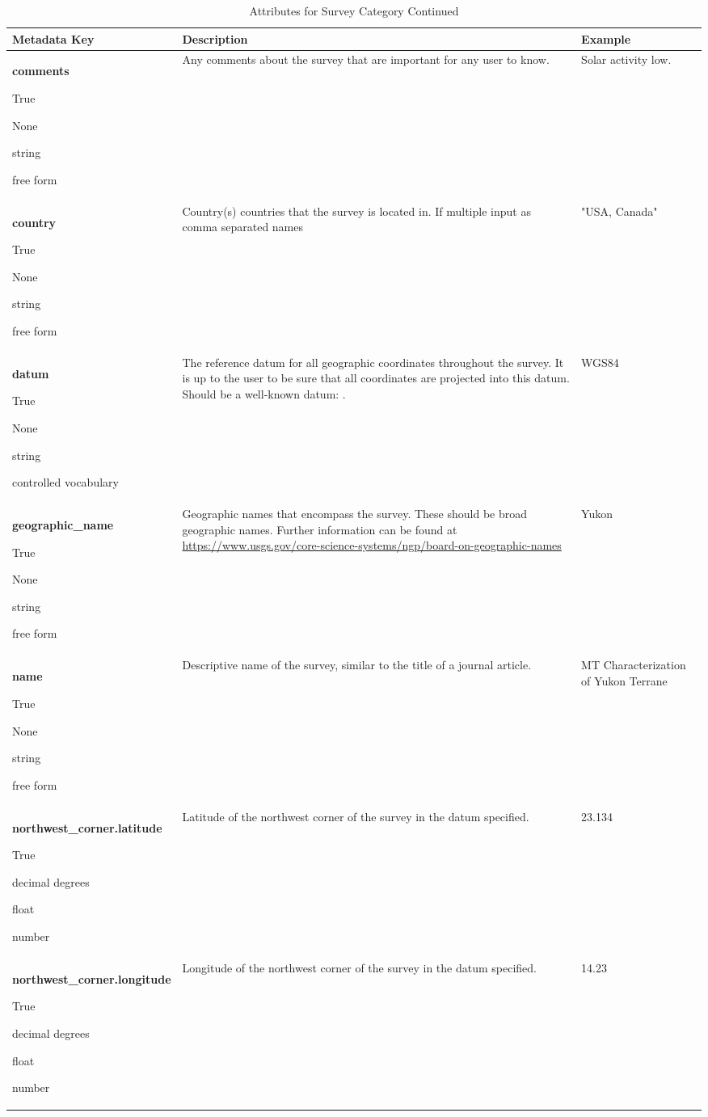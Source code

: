 \documentclass[12pt]{article}
\newcommand{\entry}[7]{
	\textbf{#1} 
	\begin{itemize}[topsep=5pt,itemsep=-.1pt,parsep=-2pt,partopsep=0pt,labelwidth=2em,align=left,itemindent=1em]
		\begin{small}
			\item[Required:] #2
			\item[Units:] #3
			\item[Type:] #4
			\item[Style:] #5
		\end{small}
	\end{itemize} & #6 & #7 \\ \midrule}
\begin{document}
\begin{table}[h!]
	\caption*{Attributes for Survey Category Continued}
	\begin{tabular}{p{}p{}p{}}
		\textbf{Metadata Key} & \textbf{Description} & \textbf{Example} \\ \toprule
		\entry{comments}{True}{None}{string}{free form}{Any comments about the survey that are important for any user to know.}{Solar activity low.}	
		\entry{country}{True}{None}{string}{free form}{Country(s) countries that the survey is located in. If multiple input as comma separated names}{"USA, Canada"}
		\entry{datum}{True}{None}{string}{controlled vocabulary}{The reference datum for all geographic coordinates throughout the survey. It is up to the user to be sure that all coordinates are projected into this datum.  Should be a well-known datum: \qquad [ WGS84 $|$ NAD83 $|$ OSGB36 $|$ GDA94 $|$ ETRS89 $|$ PZ-90.11 $|$ other ].}{WGS84}
		\entry{geographic\_name}{True}{None}{string}{free form}{Geographic names that encompass the survey.  These should be broad geographic names.  Further information can be found at \url{https://www.usgs.gov/core-science-systems/ngp/board-on-geographic-names}}{Yukon}
		\entry{name}{True}{None}{string}{free form}{Descriptive name of the survey, similar to the title of a journal article.}{MT Characterization of Yukon Terrane}
		\entry{northwest\_corner.latitude}{True}{decimal degrees}{float}{number}{Latitude of the northwest corner of the survey in the datum specified.}{23.134}
		\entry{northwest\_corner.longitude}{True}{decimal degrees}{float}{number}{Longitude of the northwest corner of the survey in the datum specified.}{14.23}
	
	\end{tabular}
	\label{tab:survey2}
\end{table} 

\clearpage
\newpage
\end{document}

